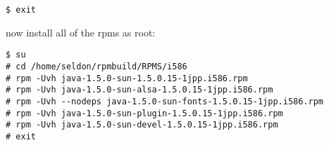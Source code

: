 \begin{snugshade}\begin{lstlisting}
$ exit
\end{lstlisting}\end{snugshade}\noindent
now install all of the rpms as root:
\begin{snugshade}\begin{lstlisting}
$ su 
# cd /home/seldon/rpmbuild/RPMS/i586
# rpm -Uvh java-1.5.0-sun-1.5.0.15-1jpp.i586.rpm
# rpm -Uvh java-1.5.0-sun-alsa-1.5.0.15-1jpp.i586.rpm
# rpm -Uvh --nodeps java-1.5.0-sun-fonts-1.5.0.15-1jpp.i586.rpm
# rpm -Uvh java-1.5.0-sun-plugin-1.5.0.15-1jpp.i586.rpm
# rpm -Uvh java-1.5.0-sun-devel-1.5.0.15-1jpp.i586.rpm
# exit
\end{lstlisting}\end{snugshade}\noindent










\newpage
